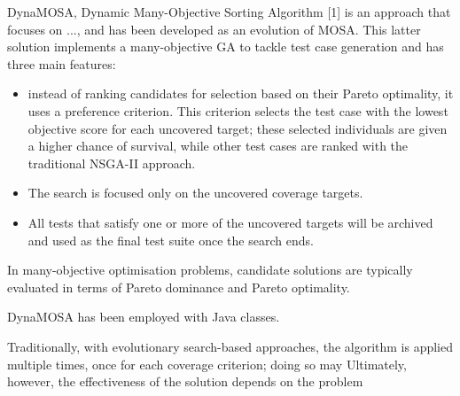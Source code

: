 DynaMOSA, Dynamic Many-Objective Sorting Algorithm [1] is an approach that focuses on ..., and has been developed as an evolution 
of MOSA. This latter solution implements a many-objective GA to tackle test case generation and has three main features: 
\begin{itemize}
    \item instead of ranking candidates for selection based on their Pareto optimality, it uses a preference criterion.
        This criterion selects the test case with the lowest objective score for each uncovered target; these selected individuals
        are given a higher chance of survival, while other test cases are ranked with the traditional NSGA-II approach.
    \item The search is focused only on the uncovered coverage targets.
    \item All tests that satisfy one or more of the uncovered targets will be archived and used as the final test suite once the search ends.
\end{itemize}

In many-objective optimisation problems, candidate solutions are typically evaluated in terms of Pareto dominance and Pareto optimality.


DynaMOSA has been employed with Java classes.

Traditionally, with evolutionary search-based approaches, the algorithm is applied multiple times, 
once for each coverage criterion; doing so may 
Ultimately, however, the effectiveness of the solution depends on the problem